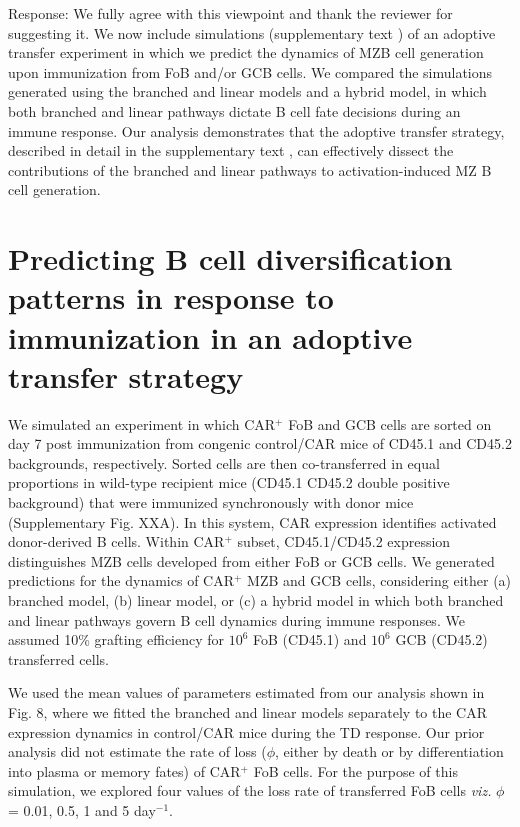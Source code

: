 \documentclass[11pt]{article}
\newcommand{\gray}[1]{{\color{gray}{#1}}}
\newcommand{\red}[1]{{\color{red}{#1}}}
\begin{document}
\gray{
3) In general, I believe that mathematical models should try to predict new features rather than just recapitulate existing data. Are there any new predictions for further experiments that the authors can propose, as this would increase the usefulness of the modeling section.
}

Response: We fully agree with this viewpoint and thank the reviewer for suggesting it. 
We now include simulations (supplementary text \red{XX}) of an adoptive transfer experiment in which we predict the dynamics of MZB cell generation upon immunization from FoB and/or GCB cells.
We compared the simulations generated using the branched and linear models and a hybrid model, in which both branched and linear pathways dictate B cell fate decisions during an immune response.
Our analysis demonstrates that the adoptive transfer strategy, described in detail in the supplementary text \red{XX}, can effectively dissect the contributions of the branched and linear pathways to activation-induced MZ B cell generation.
\clearpage


\section*{Predicting B cell diversification patterns in response to immunization in an adoptive transfer strategy}

We simulated an experiment in which CAR$^{+}$ FoB and GCB cells are sorted on day 7 post immunization from congenic control/CAR mice of CD45.1 and CD45.2 backgrounds, respectively. 
Sorted cells are then co-transferred in equal proportions in wild-type recipient mice (CD45.1 CD45.2 double positive background) that were immunized synchronously with donor mice (Supplementary Fig. XXA). 
In this system, CAR expression identifies activated donor-derived B cells. Within CAR$^{+}$ subset, CD45.1/CD45.2 expression distinguishes MZB cells developed from either FoB or GCB cells.
We generated predictions for the dynamics of CAR$^{+}$  MZB and GCB cells, considering either (a) branched model, (b) linear model, or (c) a hybrid model in which both branched and linear pathways govern B cell dynamics during immune responses. 
We assumed 10\% grafting efficiency for $10^{6}$ FoB (CD45.1) and $10^{6}$ GCB (CD45.2) transferred cells. 

We used the mean values of parameters estimated from our analysis shown in Fig. 8, where we fitted the branched and linear models separately to the CAR expression dynamics in control/CAR mice during the TD response.
Our prior analysis did not estimate the rate of loss ($\phi$, either by death or by differentiation into plasma or memory fates) of CAR$^{+}$ FoB cells.
For the purpose of this simulation, we explored four values of the loss rate of transferred FoB cells \textit{viz.} $\phi$ = 0.01, 0.5, 1 and 5 day$^{-1}$.
\end{document}
